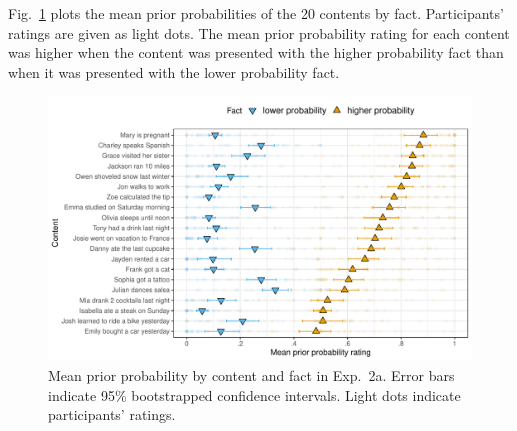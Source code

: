 \documentclass[11pt,fleqn]{article}
\newcommand{\figref}[1]{Fig.~\ref{#1}}
\newcommand{\6}{\mbox{$[\hspace*{-.6mm}[$}}
\newcommand{\9}{\mbox{$]\hspace*{-.6mm}]$}}
\begin{document}
\figref{f-prior-2a} plots the mean prior probabilities of the 20 contents by fact. Participants' ratings are given as light dots. The mean prior probability rating for each content was higher when the content was presented with the higher probability fact than when it was presented with the lower probability fact.

\begin{figure}[h!]
\centering
\includegraphics[width=.75\paperwidth]{../../results/1-prior/graphs/prior-ratings}

\caption{Mean prior probability by content and fact in Exp.~2a. Error bars indicate 95\% bootstrapped confidence intervals. Light dots indicate participants' ratings.} 
\label{f-prior-2a}
\end{figure}
\end{document}
